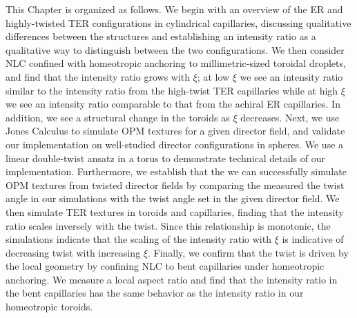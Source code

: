 This Chapter is organized as follows.
We begin with an overview of the ER and highly-twisted TER configurations in cylindrical capillaries, discussing qualitative differences between the structures and establishing an intensity ratio as a qualitative way to distinguish between the  two configurations.
We then consider NLC confined with homeotropic anchoring to millimetric-sized toroidal droplets, and find that the intensity ratio grows with $\xi$; at low $\xi$ we see an intensity ratio similar to the intensity ratio from the high-twist TER capillaries while at high $\xi$ we see an intensity ratio comparable to that from the achiral ER capillaries.
In addition, we see a structural change in the toroids as $\xi$ decreases.
Next, we use Jones Calculus to simulate OPM textures for a given director field, and validate our implementation on well-studied director configurations in spheres.
We use a linear double-twist ansatz in a torus to demonstrate technical details of our implementation.
Furthermore, we establish that the we can successfully simulate OPM textures from twisted director fields by comparing the measured the twist angle in our simulations with the twist angle set in the given director field.
We then simulate TER textures in toroids and capillaries, finding that the intensity ratio scales inversely with the twist.
Since this relationship is monotonic, the simulations indicate that the scaling of the intensity ratio with $\xi$ is indicative of decreasing twist with increasing $\xi$.
Finally, we confirm that the twist is driven by the local geometry by confining NLC to bent capillaries under homeotropic anchoring.
We measure a local aspect ratio and find that the intensity ratio in the bent capillaries has the same behavior as the intensity ratio in our homeotropic toroids.





